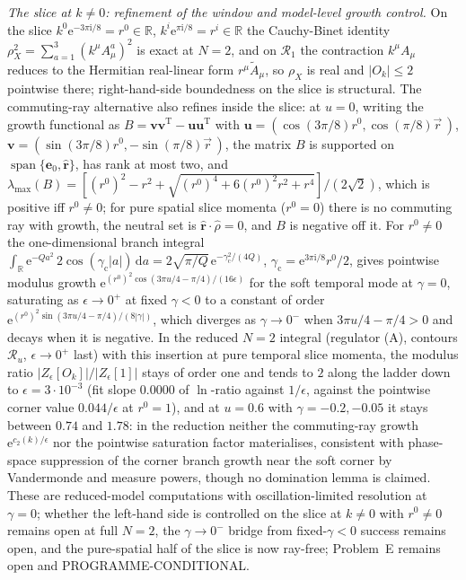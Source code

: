 \emph{The slice at \(k\ne0\): refinement of the window and model-level growth control.} On the slice \(k^0\mathrm e^{-3\pi\mathrm i/8}=r^0\in\mathbb R\), \(k^i\mathrm e^{\pi\mathrm i/8}=r^i\in\mathbb R\) the Cauchy-Binet identity \(\rho_X^2=\sum_{a=1}^{3}{(k^\mu A^a_\mu)}^2\) is exact at \(N=2\), and on \(\mathcal R_1\) the contraction \(k^\mu A_\mu\) reduces to the Hermitian real-linear form \(r^\mu\tilde A_\mu\), so \(\rho_X\) is real and \(|O_k|\le2\) pointwise there; right-hand-side boundedness on the slice is structural. The commuting-ray alternative also refines inside the slice: at \(u=0\), writing the growth functional as \(B=\mathbf v\mathbf v^{\mathrm T}-\mathbf u\mathbf u^{\mathrm T}\) with \(\mathbf u=(\cos(3\pi/8)r^0,\cos(\pi/8)\vec r\,)\), \(\mathbf v=(\sin(3\pi/8)r^0,-\sin(\pi/8)\vec r\,)\), the matrix \(B\) is supported on \(\operatorname{span}\{\mathbf e_0,\hat{\mathbf r}\}\), has rank at most two, and \(\lambda_{\max}(B)=[{(r^0)}^2-r^2+\sqrt{{(r^0)}^4+6{(r^0)}^2r^2+r^4}]/(2\sqrt2)\), which is positive iff \(r^0\ne0\); for pure spatial slice momenta (\(r^0=0\)) there is no commuting ray with growth, the neutral set is \(\hat{\mathbf r}\cdot\hat\rho=0\), and \(B\) is negative off it. For \(r^0\ne0\) the one-dimensional branch integral \(\int_{\mathbb R}\mathrm e^{-Qa^2}\,2\cos(\gamma_{\mathrm c}|a|)\,\mathrm da=2\sqrt{\pi/Q}\,\mathrm e^{-\gamma_{\mathrm c}^2/(4Q)}\), \(\gamma_{\mathrm c}=\mathrm e^{3\pi\mathrm i/8}r^0/2\), gives pointwise modulus growth \(\mathrm e^{{(r^0)}^2\cos(3\pi u/4-\pi/4)/(16\epsilon)}\) for the soft temporal mode at \(\gamma=0\), saturating as \(\epsilon\to0^+\) at fixed \(\gamma<0\) to a constant of order \(\mathrm e^{{(r^0)}^2\sin(3\pi u/4-\pi/4)/(8|\gamma|)}\), which diverges as \(\gamma\to0^-\) when \(3\pi u/4-\pi/4>0\) and decays when it is negative. In the reduced \(N=2\) integral (regulator (A), contours \(\mathcal R_u\), \(\epsilon\to0^+\) last) with this insertion at pure temporal slice momenta, the modulus ratio \(|Z_\epsilon[O_k]|/|Z_\epsilon[1]|\) stays of order one and tends to \(2\) along the ladder down to \(\epsilon=3\cdot10^{-3}\) (fit slope \(0.0000\) of \(\ln\)-ratio against \(1/\epsilon\), against the pointwise corner value \(0.044/\epsilon\) at \(r^0=1\)), and at \(u=0.6\) with \(\gamma=-0.2,-0.05\) it stays between \(0.74\) and \(1.78\): in the reduction neither the commuting-ray growth \(\mathrm e^{c_2(k)/\epsilon}\) nor the pointwise saturation factor materialises, consistent with phase-space suppression of the corner branch growth near the soft corner by Vandermonde and measure powers, though no domination lemma is claimed. These are reduced-model computations with oscillation-limited resolution at \(\gamma=0\); whether the left-hand side is controlled on the slice at \(k\ne0\) with \(r^0\ne0\) remains open at full \(N=2\), the \(\gamma\to0^-\) bridge from fixed-\(\gamma<0\) success remains open, and the pure-spatial half of the slice is now ray-free; Problem~E remains open and PROGRAMME-CONDITIONAL.

